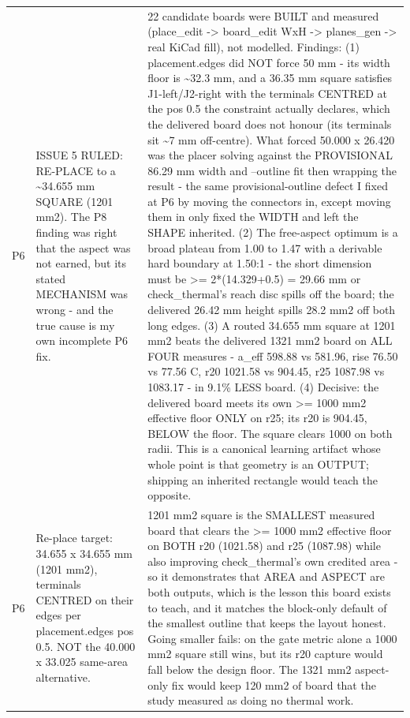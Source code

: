 \documentclass[11pt,a4paper]{article}
\begin{document}
{\begin{longtable}{lp{5.2cm}p{7.2cm}}
P6 & ISSUE 5 RULED: RE-PLACE to a \textasciitilde{}34.655 mm SQUARE (1201 mm2). The P8 finding was right that the aspect was not earned, but its stated MECHANISM was wrong - and the true cause is my own incomplete P6 fix. & 22 candidate boards were BUILT and measured (place\_edit -\textgreater{} board\_edit WxH -\textgreater{} planes\_gen -\textgreater{} real KiCad fill), not modelled. Findings: (1) placement.edges did NOT force 50 mm - its width floor is \textasciitilde{}32.3 mm, and a 36.35 mm square satisfies J1-left/J2-right with the terminals CENTRED at the pos 0.5 the constraint actually declares, which the delivered board does not honour (its terminals sit \textasciitilde{}7 mm off-centre). What forced 50.000 x 26.420 was the placer solving against the PROVISIONAL 86.29 mm width and --outline fit then wrapping the result - the same provisional-outline defect I fixed at P6 by moving the connectors in, except moving them in only fixed the WIDTH and left the SHAPE inherited. (2) The free-aspect optimum is a broad plateau from 1.00 to 1.47 with a derivable hard boundary at 1.50:1 - the short dimension must be \textgreater{}= 2{*}(14.329+0.5) = 29.66 mm or check\_thermal's reach disc spills off the board; the delivered 26.42 mm height spills 28.2 mm2 off both long edges. (3) A routed 34.655 mm square at 1201 mm2 beats the delivered 1321 mm2 board on ALL FOUR measures - a\_eff 598.88 vs 581.96, rise 76.50 vs 77.56 C, r20 1021.58 vs 904.45, r25 1087.98 vs 1083.17 - in 9.1\% LESS board. (4) Decisive: the delivered board meets its own \textgreater{}= 1000 mm2 effective floor ONLY on r25; its r20 is 904.45, BELOW the floor. The square clears 1000 on both radii. This is a canonical learning artifact whose whole point is that geometry is an OUTPUT; shipping an inherited rectangle would teach the opposite. \\
P6 & Re-place target: 34.655 x 34.655 mm (1201 mm2), terminals CENTRED on their edges per placement.edges pos 0.5. NOT the 40.000 x 33.025 same-area alternative. & 1201 mm2 square is the SMALLEST measured board that clears the \textgreater{}= 1000 mm2 effective floor on BOTH r20 (1021.58) and r25 (1087.98) while also improving check\_thermal's own credited area - so it demonstrates that AREA and ASPECT are both outputs, which is the lesson this board exists to teach, and it matches the block-only default of the smallest outline that keeps the layout honest. Going smaller fails: on the gate metric alone a 1000 mm2 square still wins, but its r20 capture would fall below the design floor. The 1321 mm2 aspect-only fix would keep 120 mm2 of board that the study measured as doing no thermal work. \\

\end{longtable}}
\end{document}
